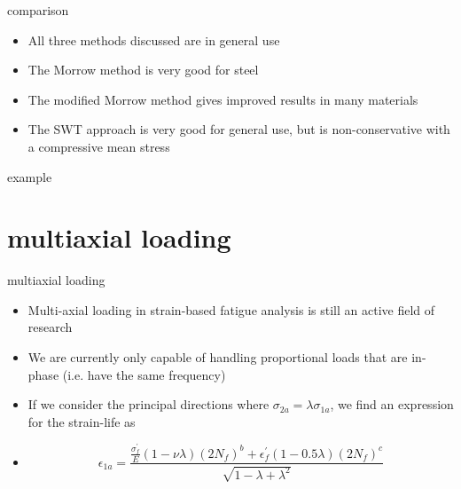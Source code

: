 \documentclass[10pt]{beamer}
\begin{document}
\begin{frame}{comparison}
	\begin{itemize}[<+->]
		\item All three methods discussed are in general use
		\item The Morrow method is very good for steel
		\item The modified Morrow method gives improved results in many materials
		\item The SWT approach is very good for general use, but is non-conservative with a compressive mean stress
	\end{itemize}
\end{frame}

\begin{frame}{example}
	
\end{frame}

\section{multiaxial loading}

\begin{frame}{multiaxial loading}
	\begin{itemize}[<+->]
		\item Multi-axial loading in strain-based fatigue analysis is still an active field of research
		\item We are currently only capable of handling proportional loads that are in-phase (i.e. have the same frequency)
		\item If we consider the principal directions where $\sigma_{2a} = \lambda \sigma_{1a}$, we find an expression for the strain-life as
		\item[] \begin{equation}
		\epsilon_{1a} = \frac{\frac{\sigma_f^\prime}{E}(1-\nu \lambda)(2N_f)^b + \epsilon_f^\prime(1-0.5\lambda)(2N_f)^c}{\sqrt{1-\lambda+\lambda^2}}
		\end{equation}
	\end{itemize}
\end{frame}
\end{document}
